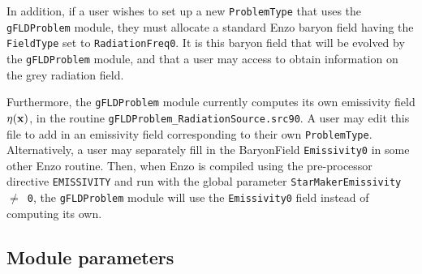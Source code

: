\documentclass[letterpaper,10pt]{article}
\renewcommand{\(}{\left(}
\renewcommand{\)}{\right)}
\newcommand{\xvec}{{\bf x}}
\begin{document}
In addition, if a user wishes to set up a new {\tt ProblemType} that
uses the {\tt gFLDProblem} module, they must allocate a standard Enzo
baryon field having the {\tt FieldType} set to {\tt RadiationFreq0}.
It is this baryon field that will be evolved by the {\tt gFLDProblem}
module, and that a user may access to obtain information on the
grey radiation field. 

Furthermore, the {\tt gFLDProblem} module currently computes its own
emissivity field $\eta(\xvec)$, in the routine 
{\tt gFLDProblem\_RadiationSource.src90}.  A user may edit this file
to add in an emissivity field corresponding to their own 
{\tt ProblemType}.  Alternatively, a user may separately fill in the
BaryonField {\tt Emissivity0} in some other Enzo routine.  Then, when
Enzo is compiled using the pre-processor directive {\tt EMISSIVITY}
and run with the global parameter {\tt StarMakerEmissivity $\ne$ 0},
the {\tt gFLDProblem} module will use the {\tt Emissivity0} field
instead of computing its own. 



\subsection{Module parameters}
\end{document}
